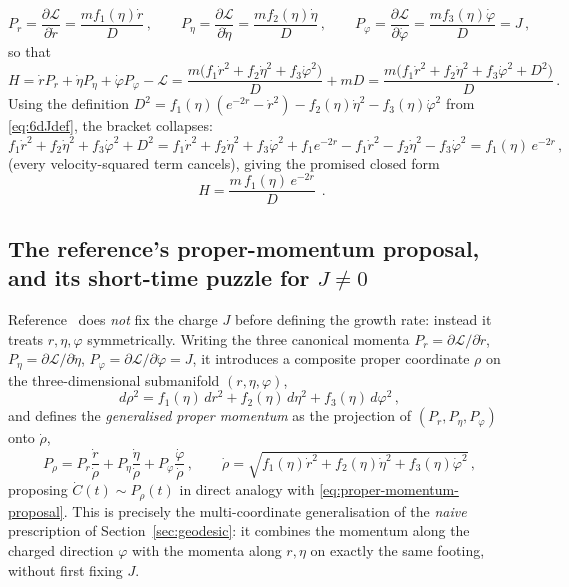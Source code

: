 \documentclass[11pt]{article}
\begin{document}
\begin{equation}
P_r=\frac{\partial\mathcal L}{\partial \dot r}=\frac{mf_1(\eta)\dot r}{D}\,,
\qquad
P_\eta=\frac{\partial\mathcal L}{\partial \dot\eta}=\frac{mf_2(\eta)\dot\eta}{D}\,,
\qquad
P_\varphi=\frac{\partial\mathcal L}{\partial \dot\varphi}=\frac{mf_3(\eta)\dot\varphi}{D}=J\,,
\label{eq:6d-three-momenta}
\end{equation}
so that
\begin{equation}
H=\dot rP_r+\dot\eta P_\eta+\dot\varphi P_\varphi-\mathcal L
=\frac{m\big(f_1\dot r^2+f_2\dot\eta^2+f_3\dot\varphi^2\big)}{D}+mD
=\frac{m\big(f_1\dot r^2+f_2\dot\eta^2+f_3\dot\varphi^2+D^2\big)}{D}\,.
\end{equation}
Using the definition $D^2=f_1(\eta)(e^{-2r}-\dot r^2)-f_2(\eta)\dot\eta^2-f_3(\eta)\dot\varphi^2$ from \eqref{eq:6dJdef}, the bracket collapses:
\begin{equation}
f_1\dot r^2+f_2\dot\eta^2+f_3\dot\varphi^2+D^2 = f_1\dot r^2+f_2\dot\eta^2+f_3\dot\varphi^2 + f_1e^{-2r}-f_1\dot r^2-f_2\dot\eta^2-f_3\dot\varphi^2 = f_1(\eta)\,e^{-2r}\,,
\end{equation}
(every velocity-squared term cancels), giving the promised closed form
\begin{equation}
\boxed{\;H=\frac{m\,f_1(\eta)\,e^{-2r}}{D}\;}\,.
\label{eq:6dHformula}
\end{equation}

\subsection{The reference's proper-momentum proposal, and its short-time puzzle for $J\neq0$}
\label{subsec:6dnaive}

Reference~\cite{Fatemiabhari:2026rob} does \emph{not} fix the charge $J$ before defining the growth rate: instead it treats $r,\eta,\varphi$ symmetrically. Writing the three canonical momenta $P_r=\partial\mathcal L/\partial\dot r$, $P_\eta=\partial\mathcal L/\partial\dot\eta$, $P_\varphi=\partial\mathcal L/\partial\dot\varphi=J$, it introduces a composite proper coordinate $\rho$ on the three-dimensional submanifold $(r,\eta,\varphi)$,
\begin{equation}
d\rho^2 = f_1(\eta)\,dr^2+f_2(\eta)\,d\eta^2+f_3(\eta)\,d\varphi^2\,,
\label{eq:6drho}
\end{equation}
and defines the \emph{generalised proper momentum} as the projection of $(P_r,P_\eta,P_\varphi)$ onto $\dot\rho$,
\begin{equation}
P_\rho
=
P_r\frac{\dot r}{\dot\rho}+P_\eta\frac{\dot\eta}{\dot\rho}+P_\varphi\frac{\dot\varphi}{\dot\rho}\,,
\qquad
\dot\rho=\sqrt{f_1(\eta)\dot r^2+f_2(\eta)\dot\eta^2+f_3(\eta)\dot\varphi^2}\,,
\label{eq:6dPrho}
\end{equation}
proposing $\dot C(t)\sim P_\rho(t)$ in direct analogy with \eqref{eq:proper-momentum-proposal}. This is precisely the multi-coordinate generalisation of the \emph{naive} prescription of Section~\ref{sec:geodesic}: it combines the momentum along the charged direction $\varphi$ with the momenta along $r,\eta$ on exactly the same footing, without first fixing $J$.
\end{document}
